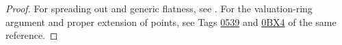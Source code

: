 \begin{proof}

	\Yang{}
	For spreading out and generic flatness, see \cite[Tags \href{https://stacks.math.columbia.edu/tag/01ZM}{01ZM}, \href{https://stacks.math.columbia.edu/tag/051S}{051S}]{Stacksprojectauthors-2026-StacksProject}.
	For the valuation-ring argument and proper extension of points, see Tags \href{https://stacks.math.columbia.edu/tag/0539}{0539} and \href{https://stacks.math.columbia.edu/tag/0BX4}{0BX4} of the same reference.
	\Yang{}


\end{proof}















